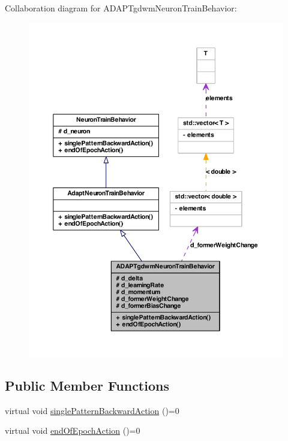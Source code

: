 Collaboration diagram for ADAPTgdwmNeuronTrainBehavior:
\nopagebreak
\begin{figure}[H]
\begin{center}
\leavevmode
\includegraphics[width=400pt]{class_a_d_a_p_tgdwm_neuron_train_behavior__coll__graph}
\end{center}
\end{figure}
\subsection*{Public Member Functions}
\begin{DoxyCompactItemize}
\item 
virtual void \hyperlink{class_a_d_a_p_tgdwm_neuron_train_behavior_af3524a3adf772e90a05f3d2693377d02}{singlePatternBackwardAction} ()=0
\item 
virtual void \hyperlink{class_a_d_a_p_tgdwm_neuron_train_behavior_aa280eefc693a37f4a0ac33f47684dbb2}{endOfEpochAction} ()=0
\end{DoxyCompactItemize}

